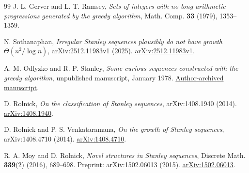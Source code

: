\documentclass[11pt]{article}
\theoremstyle{definition}\newtheorem{definition}[theorem]{Definition}
\theoremstyle{remark}\newtheorem{remark}[theorem]{Remark}
\numberwithin{equation}{section}
\begin{document}
\begin{thebibliography}{99}
J. L. Gerver and L. T. Ramsey,
\emph{Sets of integers with no long arithmetic progressions generated by the greedy algorithm},
Math. Comp. \textbf{33} (1979), 1353--1359.

N. Sothanaphan,
\emph{Irregular Stanley sequences plausibly do not have growth $\Theta(n^2/\log n)$},
arXiv:2512.11983v1 (2025).
\href{https://arxiv.org/abs/2512.11983v1}{arXiv:2512.11983v1}.

A. M. Odlyzko and R. P. Stanley,
\emph{Some curious sequences constructed with the greedy algorithm},
unpublished manuscript, January 1978.
\href{https://www.dtc.umn.edu/~odlyzko/unpublished/greedy.sequence.pdf}{Author-archived manuscript}.

D. Rolnick, \emph{On the classification of Stanley sequences},
arXiv:1408.1940 (2014).
\href{https://arxiv.org/abs/1408.1940}{arXiv:1408.1940}.

D. Rolnick and P. S. Venkataramana,
\emph{On the growth of Stanley sequences},
arXiv:1408.4710 (2014).
\href{https://arxiv.org/abs/1408.4710}{arXiv:1408.4710}.

R. A. Moy and D. Rolnick, \emph{Novel structures in Stanley sequences},
Discrete Math. \textbf{339}(2) (2016), 689--698. Preprint: arXiv:1502.06013 (2015).
\href{https://arxiv.org/abs/1502.06013}{arXiv:1502.06013}.
\end{thebibliography}
\end{document}
